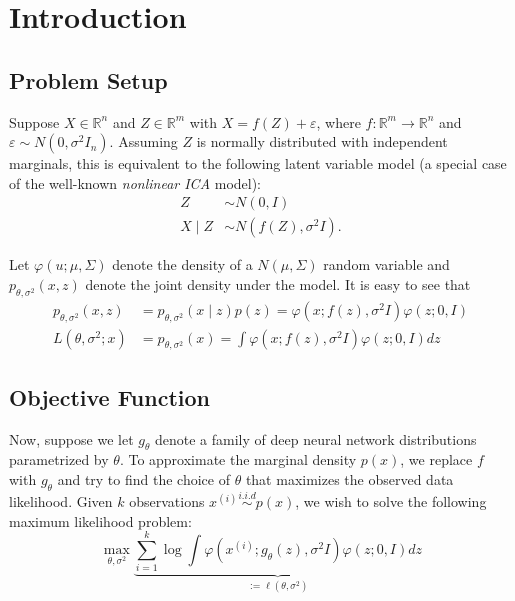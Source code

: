 \section{Introduction}
\subsection{Problem Setup}
Suppose $X \in \mathbb{R}^{n}$ and $Z \in \mathbb{R}^{m}$ with $X=f(Z)+\varepsilon$, where $f: \mathbb{R}^{m} \rightarrow \mathbb{R}^{n}$ and $\varepsilon \sim N\left(0, \sigma^{2} I_{n}\right)$. Assuming $Z$ is normally distributed with independent marginals, this is equivalent to the following latent variable model (a special case of the well-known \textit{nonlinear ICA} model):
\begin{equation} \label{eq:1}
\begin{aligned}
Z & \sim N\left(0, I\right) \\
X \mid Z & \sim N\left(f(Z), \sigma^{2} I\right) .
\end{aligned}
\end{equation}

Let $\varphi(u ; \mu, \Sigma)$ denote the density of a $N(\mu, \Sigma)$ random variable and $p_{\theta, \sigma^{2}}(x, z)$ denote the joint density under the model. It is easy to see that
\begin{equation} \label{eq:2}
\begin{aligned}
p_{\theta, \sigma^{2}}\left(x, z\right) &=p_{\theta, \sigma^{2}} \left(x \mid z\right) p(z)=\varphi\left(x ; f(z), \sigma^{2} I\right) \varphi(z ; 0, I) \\
L \left(\theta, \sigma^{2} ; x\right) &= p_{\theta, \sigma^{2}}\left(x\right) =\int \varphi\left(x ; f(z), \sigma^{2} I\right) \varphi(z ; 0, I) dz
\end{aligned}
\end{equation}

\subsection{Objective Function}
Now, suppose we let $g_{\theta}$ denote a family of deep neural network distributions parametrized by $\theta$. To approximate the marginal density $p(x)$, we replace $f$ with $g_{\theta}$ and try to find the choice of $\theta$ that maximizes the observed data likelihood. Given $k$ observations $x^{(i)} \stackrel{i.i.d}{\sim} p(x)$, we wish to solve the following maximum likelihood problem:
\begin{equation} \label{eq:3}
\max_{\theta, \sigma^{2}} \underbrace{\sum_{i=1}^{k} \log \int \varphi\left(x^{(i)} ; g_{\theta}(z), \sigma^{2} I\right) \varphi(z ; 0, I) dz}_{:=\ell(\theta, \sigma^{2})}
\end{equation}

